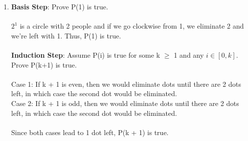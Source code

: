 \documentclass[12pt]{article}
\begin{document}
\begin{enumerate}[label = (\alph*)]
        \textbf{Basis Step}: Prove P(3) and P(4) is true.\\
        \\
        $\frac{7}{4}^3 \approx 5.359$ \\
        $a_3 = a_2 + a_1 = 3 + 1 = 4$ \\
        $\frac{7}{4}^4 \approx 9.378$ \\
        $a_4 = a_3 + a_2 = 4 + 3 = 7$ \\
        \\
        Since $4 \leq 5.359$ and $7 \leq 9.378$, this statement holds for the basis case.\\
        \\
        \textbf{Induction Step}: Assume P(i) is true for some k $\geq$ 3 and any 
        $i \in [0, k]$. Prove P(k+1) is true. \\
        \\
        $a_{k+1} = a_{k} + a_{k-1}$ \\
        $\leq \frac{7}{4}^{k} + \frac{7}{4}^{k-1}$ \hspace{6em} ($\because$ P(i) is true) \\
        = $\frac{7}{4} \cdot \frac{7}{4}^{k-1} + \frac{7}{4}^{k-1}$ \hspace{6em} ($\because$ Exponent Rules) \\
        = $(\frac{7}{4} + 1)\frac{7}{4}^{k-1}$ \hspace{6em} ($\because$ Factoring Out $\frac{7}{4}^{k-2}$) \\
        $\leq (\frac{7}{4})^2 \cdot \frac{7}{4}^{k-1}$ \hspace{6em} ($\because
            (\frac{7}{4})^2 > \frac{7}{4} + 1$) \\
        = $\frac{7}{4}^{k+1}$ \hspace{10em} ($\because$ Exponent Rules) \\
        \\
        $\therefore$ P(k+1) is true.
    
    \item 

        \textbf{Basis Step}: Prove P(1) is true.\\
        \\
        $2^1$ is a circle with 2 people and if we go clockwise from 1, we eliminate 2 and we're left with
        1. Thus, P(1) is true. \\
        \\
        \textbf{Induction Step}: Assume P(i) is true for some k $\geq$ 1 and any 
        $i \in [0, k]$. Prove P(k+1) is true. \\
        \\
        Case 1: If k + 1 is even, then we would eliminate dots until there are 2 dots left, in which case
        the second dot would be eliminated. \\
        Case 2: If k + 1 is odd, then we would eliminate dots until there are 2 dots left, in which case
        the second dot would be eliminated. \\
        \\
        Since both cases lead to 1 dot left, P(k + 1) is true.


\end{enumerate}
\end{document}
